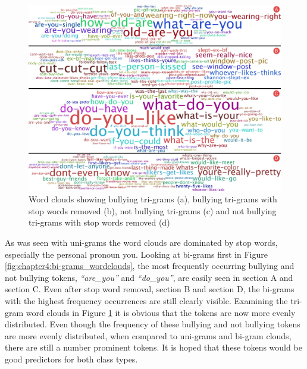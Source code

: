 \begin{figure}[!htb]
	\centering
	\includegraphics[width=1.0\textwidth]{Figures/Chapter4/trigram_clouds.jpg}
	\caption[Tri-gram word clouds]{Word clouds showing bullying tri-grams (a), bullying tri-grams with stop words removed (b), not bullying tri-grams (c) and not bullying tri-grams with stop words removed (d)}
	\label{fig:chapter4:trigram_wordclouds}
\end{figure}

As was seen with uni-grams the word clouds are dominated by stop words, especially the personal pronoun you. Looking at bi-grams first in Figure \ref{fig:chapter4:bi-grams_wordclouds}, the most frequently occurring bullying and not bullying tokens, \textit{``are\_you''} and \textit{``do\_you''}, are easily seen in section A and section C. Even after stop word removal, section B and section D, the bi-grams with the highest frequency occurrences are still clearly visible. Examining the tri-gram word clouds in Figure \ref{fig:chapter4:trigram_wordclouds} it is obvious that the tokens are now more evenly distributed. Even though the frequency of these bullying and not bullying tokens are more evenly distributed, when compared to uni-grams and bi-gram clouds, there are still a number prominent tokens. It is hoped that these tokens would be good predictors for both class types.



